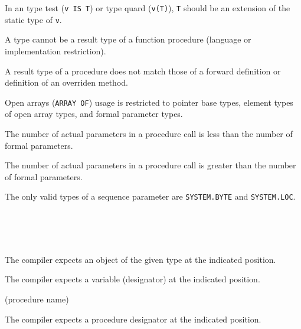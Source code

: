 
In an \ot{} type test (\verb'v IS T') or type quard (\verb'v(T)'),
\verb'T' should be an extension of the static type of \verb'v'.


A type cannot be a result type of a function procedure (language or
implementation restriction).


A result type of a procedure does not match those of a forward
definition or definition of an overriden method.


Open arrays (\verb'ARRAY OF') usage is restricted to pointer base types,
element types of open array types, and formal parameter types.


The number of actual parameters in a procedure call is less than
the number of formal parameters.


The number of actual parameters in a procedure call is greater than
the number of formal parameters.


The only valid types of a sequence parameter are
\verb'SYSTEM.BYTE' and \verb'SYSTEM.LOC'.

  \ifonline\else\\\fi
{} \ifonline\else\\\fi
{}\ifonline\else\\\fi
{}

The compiler expects an object of the given type at the indicated
position.


The compiler expects a variable (designator) at the indicated position.

(procedure name)

The compiler expects a procedure designator
at the indicated position.

